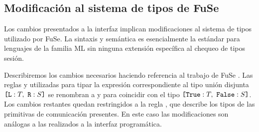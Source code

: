 \subsection{Modificación al sistema de tipos de FuSe}

Los cambios presentados a la interfaz implican modificaciones al sistema de
tipos utilizado por FuSe. La sintaxis y semántica es esencialmente la estándar
para lenguajes de la familia ML sin ninguna extensión específica al chequeo de
tipos sesión.

Describiremos los cambios necesarios haciendo referencia al trabajo de FuSe
. Las reglas  y 
utilizadas para tipar la expresión correspondiente al tipo unión disjunta
$\set{ \Tag[L] : T,\ \Tag[R] : S}$ se renombran a  y
 para coincidir con el tipo $\BinaryLabels{T}{S}$. Los
cambios restantes quedan restringidos a la regla , que
describe los tipos de las primitivas de comunicación presentes. En este caso
las modificaciones son análogas a las realizados a la interfaz
programática.
